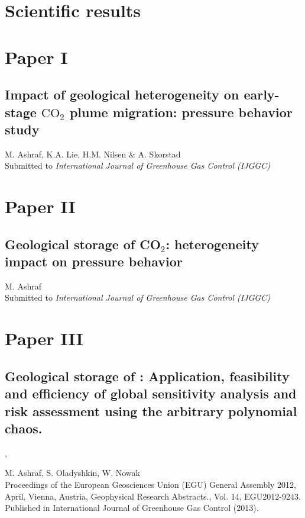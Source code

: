 \chapter{Scientific results}

\pagebreak

\chapter*{Paper I}
\section{Impact of geological heterogeneity on early-stage $\mbox{CO}_2$ plume
migration: pressure behavior study}

\noindent M. Ashraf, K.A. Lie, H.M. Nilsen \& A.
Skorstad\\

\noindent Submitted to \textit{International Journal of Greenhouse Gas Control
(IJGGC)}
\cleardoublepage




\chapter*{Paper II}
\section{Geological storage of CO$_2$: heterogeneity impact on pressure
behavior}

\noindent M. Ashraf\\

\noindent Submitted to \textit{International Journal of Greenhouse Gas Control
(IJGGC)}
\cleardoublepage



\chapter*{Paper III}
\section{Geological storage of \coo: Application, feasibility and efficiency of global sensitivity analysis and risk assessment using the arbitrary polynomial chaos.}, 


\noindent M. Ashraf, S. Oladyshkin, W. Nowak\\

\noindent Proceedings of the European Geosciences Union (EGU) General Assembly 2012, April, Vienna, Austria, Geophysical Research Abstracts., Vol. 14, EGU2012-9243. Published in International Journal of Greenhouse Gas Control (2013).
\cleardoublepage

